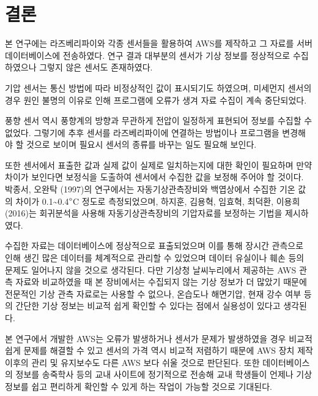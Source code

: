 \section{결론}

본 연구에는 라즈베리파이와 각종 센서들을 활용하여 AWS를 제작하고 그 자료를 서버 데이터베이스에 전송하였다. 연구 결과 대부분의 센서가 기상 정보를 정상적으로 수집하였으나 그렇지 않은 센서도 존재하였다. 

기압 센서는 통신 방법에 따라 비정상적인 값이 표시되기도 하였으며, 미세먼지 센서의 경우 원인 불명의 이유로 인해 프로그램에 오류가 생겨 자료 수집이 계속 중단되었다. 

풍향 센서 역시 풍향계의 방향과 무관하게 전압이 일정하게 표현되어 정보를 수집할 수 없었다. 그렇기에 추후 센서를 라즈베리파이에 연결하는 방법이나 프로그램을 변경해야 할 것으로 보이며 필요시 센서의 종류를 바꾸는 일도 필요해 보인다. 

또한 센서에서 표출한 값과 실제 값이 실제로 일치하는지에 대한 확인이 필요하며 만약 차이가 보인다면 보정식을 도출하여 센서에서 수집한 값을 보정해 주어야 할 것이다. 박종서, 오완탁 (1997)의 연구에서는 자동기상관측장비와 백엽상에서 수집한 기온 값의 차이가 0.1\~{}0.4$\degree$C 정도로 측정되었으며, 하지훈, 김용혁, 임효혁, 최덕환, 이용희 (2016)는 회귀분석을 사용해 자동기상관측장비의 기압자료를 보정하는 기법을 제시하였다\cite{Ref3}\cite{Ref4}. 

수집한 자료는 데이터베이스에 정상적으로 표출되었으며 이를 통해 장시간 관측으로 인해 생긴 많은 데이터를 체계적으로 관리할 수 있었으며 데이터 유실이나 훼손 등의 문제도 일어나지 않을 것으로 생각된다. 다만 기상청 날씨누리에서 제공하는 AWS 관측 자료와 비교하였을 때 본 장비에서는 수집되지 않는 기상 정보가 더 많았기 때문에 전문적인 기상 관측 자료로는 사용할 수 없으나, 온습도나 해면기압, 현재 강수 여부 등의 간단한 기상 정보는 비교적 쉽게 확인할 수 있다는 점에서 실용성이 있다고 생각된다. 

본 연구에서 개발한 AWS는 오류가 발생하거나 센서가 문제가 발생하였을 경우 비교적 쉽게 문제를 해결할 수 있고 센서의 가격 역시 비교적 저렴하기 때문에 AWS 장치 제작 이후의 관리 및 유지보수도 다른 AWS 보다 쉬울 것으로 판단된다. 또한 데이터베이스의 정보를 송죽학사 등의 교내 사이트에 정기적으로 전송해 교내 학생들이 언제나 기상 정보를 쉽고 편리하게 확인할 수 있게 하는 작업이 가능할 것으로 기대된다.